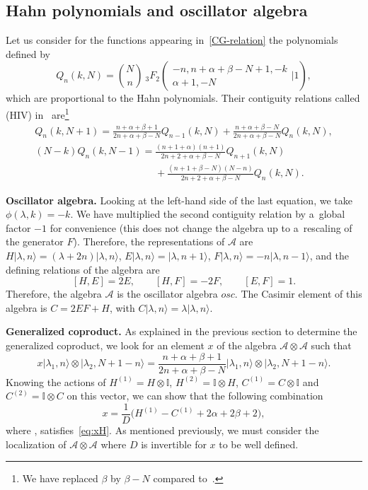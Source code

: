 \documentclass[10pt,a4paper]{amsart}
\numberwithin{equation}{section}
\theoremstyle{definition}
\begin{document}
\subsection{Hahn polynomials and oscillator algebra} \label{sec:Hahn}

Let us consider for the functions appearing in~\eqref{CG-relation} the polynomials defined by
\[Q_n(k,N)=\binom{N}{n}\ {}_3F_2\left(\begin{array}{c} -n, n+\alpha+\beta-N+1, -k \\ \alpha+1, -N\end{array}\Bigg\vert 1\right),\]
which are proportional to the Hahn polynomials.
Their contiguity relations called (HIV) in~\cite{contiguity} are\footnote{We have replaced $\beta$ by $\beta-N$ compared to~\cite{contiguity}.}
\begin{gather*}
Q_n(k,N+1)=\frac{n+\alpha+\beta+1}{2n+\alpha+\beta-N}Q_{n-1}(k,N)+\frac{n+\alpha+\beta-N}{2n+\alpha+\beta-N}Q_n(k,N),\\
(N-k)Q_n(k,N-1)=\frac{(n+1+\alpha)(n+1)}{2n+2+\alpha+\beta-N}Q_{n+1}(k,N)\\
\phantom{(N-k)Q_n(k,N-1)=}{}+\frac{(n+1+\beta-N)(N-n)}{2n+2+\alpha+\beta-N}Q_n(k,N).
\end{gather*}


{\bf Oscillator algebra.} Looking at the left-hand side of the last equation, we take
${\phi(\lambda,k)=-k}$.
We have multiplied the second contiguity relation by a~global factor $-1$ for convenience (this does not change the algebra up to a~rescaling of the generator $F$). Therefore, the representations of $\mathcal{A}$ are
$H|\lambda,n\rangle=(\lambda+2n)|\lambda,n\rangle$, $E|\lambda,n\rangle=|\lambda,n+1\rangle$, $F|\lambda,n\rangle=-n|\lambda,n-1\rangle$,
and the defining relations of the algebra are
\begin{equation}\label{eq:osc}
[H,E]=2E, \qquad [H,F]=-2F, \qquad [E,F]=1.
\end{equation}
Therefore, the algebra $\mathcal{A}$ is the oscillator algebra $osc$. The Casimir element of this algebra is
$C=2EF+H$, with $ C|\lambda,n\rangle=\lambda|\lambda,n\rangle $.

{\bf Generalized coproduct.} As explained in the previous section to determine the generalized coproduct, we look for an element $x$ of the algebra $\mathcal{A}\otimes\mathcal{A}$ such that
\begin{equation}\label{eq:xH}
 x|\lambda_1,n\rangle\otimes |\lambda_2,N+1-n\rangle=\frac{n+\alpha+\beta+1}{2n+\alpha+\beta-N}|\lambda_1,n\rangle\otimes |\lambda_2,N+1-n\rangle.
\end{equation}
Knowing the actions of $H^{(1)}=H\otimes \mathbb{I}$, $H^{(2)}=\mathbb{I} \otimes H$, $C^{(1)}=C\otimes \mathbb{I}$ and $C^{(2)}=\mathbb{I} \otimes C$ on this vector, we can show that the following combination
\[
 x=\frac{1}{D}\bigl(H^{(1)}-C^{(1)}+2\alpha+2\beta+2\bigr),\]
where , satisfies~\eqref{eq:xH}. As mentioned previously, we must consider the localization of $\mathcal{A}\otimes\mathcal{A}$ where $D$ is invertible for $x$ to be well defined.
\end{document}
